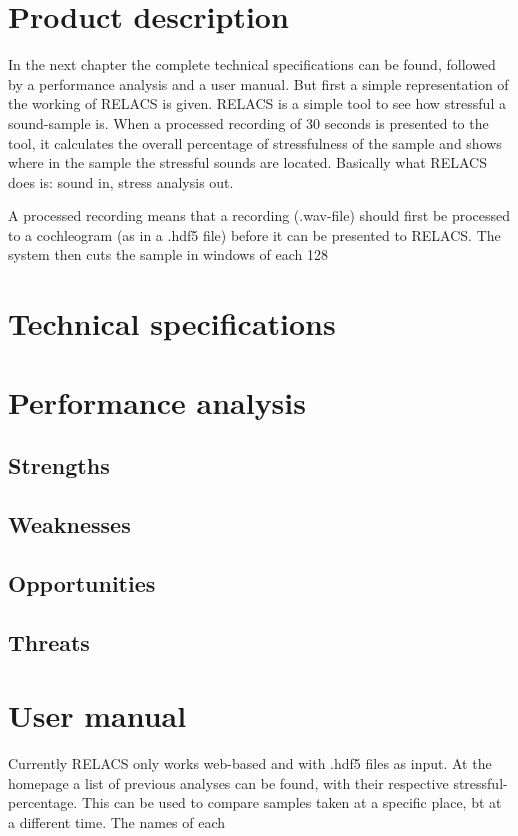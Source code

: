 \documentclass[a4paper]{article}
\begin{document}
\section{Product description}
In the next chapter the complete technical specifications can be found, followed by a performance analysis and a user manual. 
But first a simple representation of the working of RELACS is given. RELACS is a simple tool to see how stressful a sound-sample is. 
When a processed recording of 30 seconds is presented to the tool, it calculates the overall percentage of stressfulness of the sample and shows where in the sample the stressful sounds are located. 
Basically what RELACS does is: sound in, stress analysis out.

A processed recording means that a recording (.wav-file) should first be processed to a cochleogram (as in a .hdf5 file) before it can be presented to RELACS. The system then cuts the sample in windows of each 128

\section{Technical specifications}


\section{Performance analysis}

\subsection{Strengths}
\subsection{Weaknesses}
\subsection{Opportunities}
\subsection{Threats}


\section{User manual}
Currently RELACS only works web-based and with .hdf5 files as input. At the homepage a list of previous analyses can be found, with their respective stressful-percentage. This can be used to compare samples taken at a specific place, bt at a different time. The names of each 
\end{document}
